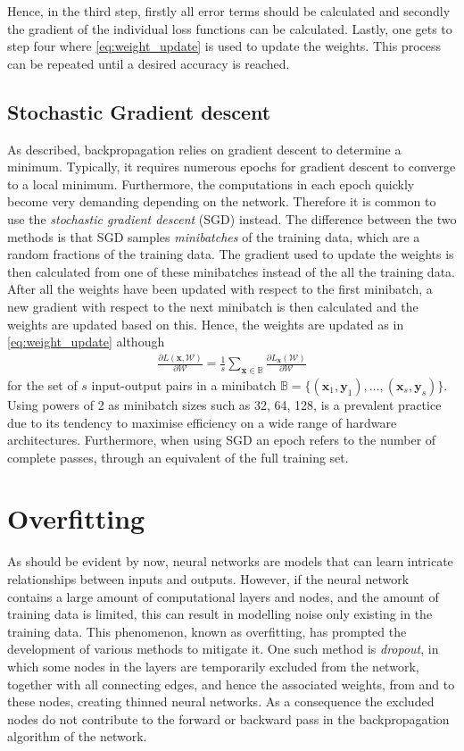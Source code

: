 Hence, in the third step, firstly all error terms should be calculated and secondly the gradient of the individual loss functions can be calculated. Lastly, one gets to step four where \autoref{eq:weight_update} is used to update the weights. This process can be repeated until a desired accuracy is reached.


\subsection{Stochastic Gradient descent}
As described, backpropagation relies on gradient descent to determine a minimum. Typically, it requires numerous epochs for gradient descent to converge to a local minimum. Furthermore, the computations in each epoch quickly become very demanding depending on the network. Therefore it is common to use the \emph{stochastic gradient descent} (SGD) instead. The difference between the two methods is that SGD samples \emph{minibatches} of the training data, which are a random fractions of the training data. The gradient used to update the weights is then calculated from one of these minibatches instead of the all the training data. After all the weights have been updated with respect to the first minibatch, a new gradient with respect to the next minibatch is then calculated and the weights are updated based on this. Hence, the weights are updated as in \eqref{eq:weight_update} although
\begin{align*}
    \frac{\partial L(\bm{x}, \mathcal{W})}{\partial \mathcal{W}} =  \frac{1}{s} \sum_{\bm x \in \mathbb{B}} \frac{\partial L_{\bm{x}}(\mathcal{W})}{\partial \mathcal{W}}
\end{align*}
for the set of $s$ input-output pairs in a minibatch $\mathbb{B} = \{(\bm{x}_1,\bm{y}_1), \ldots, (\bm{x}_s,\bm{y}_s)\}$. Using powers of 2 as minibatch sizes such as 32, 64, 128, is a prevalent practice due to its tendency to maximise efficiency on a wide range of hardware architectures. Furthermore, when using SGD an epoch refers to the number of complete passes, through an equivalent of the full training set.


\section{Overfitting}
As should be evident by now, neural networks are models that can learn intricate relationships between inputs and outputs. However, if the neural network contains a large amount of computational layers and nodes, and the amount of training data is limited, this can result in modelling noise only existing in the training data. This phenomenon, known as overfitting, has prompted the development of various methods to mitigate it. One such method is \emph{dropout}, in which some nodes in the layers are temporarily excluded from the network, together with all connecting edges, and hence the associated weights, from and to these nodes, creating thinned neural networks. As a consequence the excluded nodes do not contribute to the forward or backward pass in the backpropagation algorithm of the network. 

